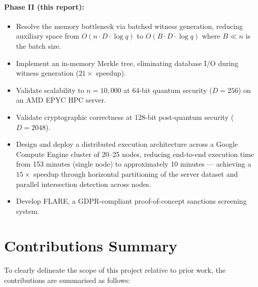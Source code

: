 \paragraph{Phase II (this report):}
\begin{itemize}
    \item Resolve the memory bottleneck via batched witness generation, reducing
          auxiliary space from $O(n \cdot D \cdot \log q)$ to $O(B \cdot D \cdot \log q)$
          where $B \ll n$ is the batch size.
    \item Implement an in-memory Merkle tree, eliminating database I/O during
          witness generation ($21\times$ speedup).
    \item Validate scalability to $n = 10{,}000$ at 64-bit quantum security ($D = 256$)
          on an AMD EPYC HPC server.
    \item Validate cryptographic correctness at 128-bit post-quantum security ($D = 2048$).
    \item Design and deploy a distributed execution architecture across a Google Compute
          Engine cluster of 20--25 nodes, reducing end-to-end execution time from 153
          minutes (single node) to approximately 10 minutes --- achieving a $15\times$
          speedup through horizontal partitioning of the server dataset and parallel
          intersection detection across nodes.
    \item Develop FLARE, a GDPR-compliant proof-of-concept sanctions screening system.
\end{itemize}

\section{Contributions Summary}

To clearly delineate the scope of this project relative to prior work, the
contributions are summarised as follows:

